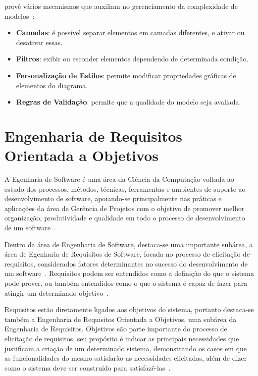 \sirius provê vários mecanismos que auxiliam no gerenciamento da complexidade de modelos~\cite{madiot2015eclipse}:

\begin{itemize}
	\item \textbf{Camadas}: é possível separar elementos em camadas diferentes, e ativar ou desativar essas.
	\item \textbf{Filtros}: exibir ou esconder elementos dependendo de determinada condição.
	\item \textbf{Fersonalização de Estilos}: permite modificar propriedades gráficas de elementos do diagrama.
	\item \textbf{Regras de Validação}: permite que a qualidade do modelo seja avaliada.
\end{itemize}



\section{Engenharia de Requisitos Orientada a Objetivos}
\label{sec-referencial-engenharia-objetivos}

A Egenharia de Software é uma área da Ciência da Computação voltada ao estudo dos processos, métodos, técnicas, ferramentas e ambientes de suporte ao desenvolvimento de software, apoiando-se principalmente nas práticas e aplicações da área de Gerência de Projetos com o objetivo de promover melhor organização, produtividade e qualidade em todo o processo de desenvolvimento de um software~\cite{falboEngSoft}.

Dentro da área de Engenharia de Software, destaca-se uma importante subárea, a área de Egenharia de Requisitos de Software, focada no processo de elicitação de requisitos, considerados fatores determinantes no sucesso do desenvolvimento de um software~\cite{falboEngReq}. Requisitos podem ser entendidos como a definição do que o sistema pode prover, ou também entendidos como o que o sistema é capaz de fazer para atingir um determinado objetivo~\cite{pfleeger2004engenharia}.

Requisitos estão diretamente ligados aos objetivos do sistema, portanto destaca-se também a Engenharia de Requisitos Orientada a Objetivos, uma subárea da Engenharia de Requisitos. Objetivos são parte importante do processo de elicitação de requisitos, seu propósito é indicar as principais necessidades que justificam a criação de um determinado sistema, demonstrando os casos em que as funcionalidades do mesmo satisfarão as necessidades elicitadas, além de dizer como o sistema deve ser construído para satisfazê-las~\cite{ross1977structured}. 

